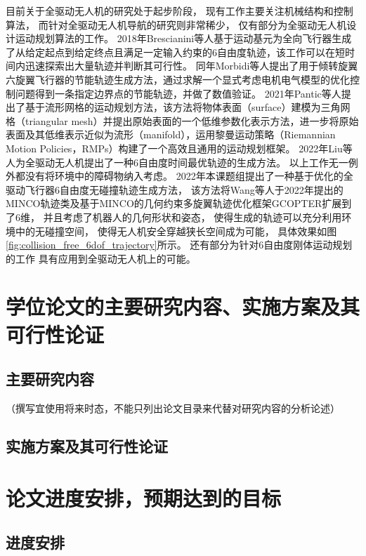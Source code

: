 目前关于全驱动无人机的研究处于起步阶段，
现有工作主要关注机械结构和控制算法，
而针对全驱动无人机导航的研究则非常稀少，
仅有部分为全驱动无人机设计运动规划算法的工作。
2018年Brescianini等人基于运动基元为全向飞行器生成了从给定起点到给定终点且满足一定输入约束的6自由度轨迹\cite{brescianini2018computationally}，该工作可以在短时间内迅速探索出大量轨迹并判断其可行性。
同年Morbidi等人提出了用于倾转旋翼六旋翼飞行器的节能轨迹生成方法\cite{morbidi2018energy}，通过求解一个显式考虑电机电气模型的优化控制问题得到一条指定边界点的节能轨迹，并做了数值验证。
2021年Pantic等人提出了基于流形网格的运动规划方法\cite{pantic2021mesh}，该方法将物体表面（surface）建模为三角网格（triangular mesh）并提出原始表面的一个低维参数化表示方法，进一步将原始表面及其低维表示近似为流形（manifold），运用黎曼运动策略（Riemannian Motion Policies，RMPs）构建了一个高效且通用的运动规划框架。
2022年Liu等人为全驱动无人机提出了一种6自由度时间最优轨迹的生成方法\cite{liu2022optimal}。
以上工作无一例外都没有将环境中的障碍物纳入考虑。
2022年本课题组提出了一种基于优化的全驱动飞行器6自由度无碰撞轨迹生成方法\cite{liu2022collision}，
该方法将Wang等人于2022年提出的MINCO轨迹类及基于MINCO的几何约束多旋翼轨迹优化框架GCOPTER\cite{wang2022geometrically}扩展到了6维，
并且考虑了机器人的几何形状和姿态，
使得生成的轨迹可以充分利用环境中的无碰撞空间，
使得无人机安全穿越狭长空间成为可能，
具体效果如图\ref{fig:collision_free_6dof_trajectory}所示。
还有部分为针对6自由度刚体运动规划的工作
\cite{nguyen2016time, belta2002svd, belta2002euclidean, bestaoui2003motion, zefran1998generation, watterson2016smooth, jackson2021planning}
具有应用到全驱动无人机上的可能。

\section{学位论文的主要研究内容、实施方案及其可行性论证}
\subsection{主要研究内容}
（撰写宜使用将来时态，不能只列出论文目录来代替对研究内容的分析论述）
\subsection{实施方案及其可行性论证}
\section{论文进度安排，预期达到的目标}
\subsection{进度安排}
